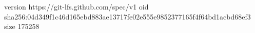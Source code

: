 version https://git-lfs.github.com/spec/v1
oid sha256:04d349f1c46d165ebd883ae13717fe02e555e9852377165f4f64bd1acbd68ef3
size 175258
